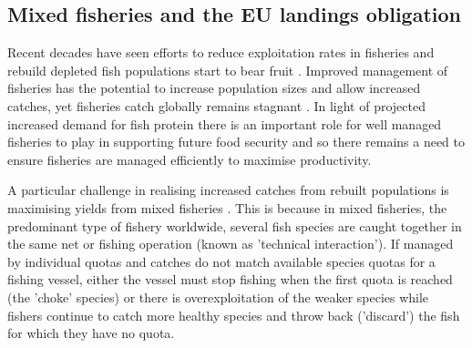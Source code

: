 \documentclass{nature}
\begin{document}
\begin{linenumbers}
\begin{abstract}
[285 words]

\end{abstract}

\section*{}

\subsection{Mixed fisheries and the EU landings obligation} 

Recent decades have seen efforts to reduce exploitation rates in fisheries and
rebuild depleted fish populations start to bear fruit \cite{Worm2009}.
Improved management of fisheries has the potential to increase population sizes
and allow increased catches, yet fisheries catch globally remains stagnant
\cite{FAO2016}.  In light of projected increased demand for fish protein
\cite{B??n??2016} there is an important role for well managed fisheries to play
in supporting future food security \cite{Mcclanahan2015} and so there remains a
need to ensure fisheries are managed efficiently to maximise productivity.

A particular challenge in realising increased catches from rebuilt populations
is maximising yields from mixed fisheries \cite{Branch2008, Kuriyama2016,
	Ulrich2016}. This is because in mixed fisheries, the predominant type
of fishery worldwide, several fish species are caught together in the same net
or fishing operation (known as 'technical interaction'). If managed by
individual quotas and catches do not match available species quotas for a
fishing vessel, either the vessel must stop fishing when the first quota is
reached (the 'choke' species) or there is overexploitation of the weaker
species while fishers continue to catch more healthy species and throw back
('discard') the fish for which they have no quota.


\end{linenumbers}
\end{document}
